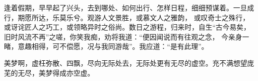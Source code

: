 \begin{adjustwidth}{0cm}{0cm}
{        \hspace*{2em} 逢着假期，早早起了兴头，去到哪处、如何出行、怎样日程，细细预谋着。一旦成行，期愿所达，乐莫乐兮。观游人文景胜，或慕文人之雅韵，
        或叹奇士之殊行，或讶诧匠人之巧工，或领略异时之俗尚。数日之游程，归来时，自生“古今易矣，旧时风流不再”之嗟，你笑我痴，劝将我道：“便因闻说而有往观之念，
        今亲身一睹，意趣相得，可不偿愿，况与我同游哉”。我应道：“是有此理”。

        \hspace*{2em} 美梦啊，虚枉弥散、四飘，尽向无际处去，无际处更有无尽的虚空。充不满想望庞芜的无尽，美梦得成亦空虚。
    }
\end{adjustwidth}
\newpage
